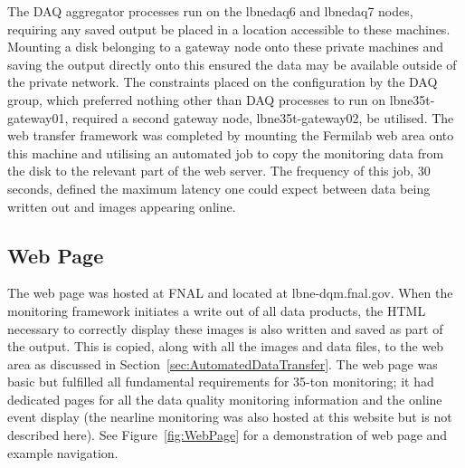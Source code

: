 The DAQ aggregator processes run on the lbnedaq6 and lbnedaq7 nodes, requiring any saved output be placed in a location accessible to these machines.  Mounting a disk belonging to a gateway node onto these private machines and saving the output directly onto this ensured the data may be available outside of the private network.  The constraints placed on the configuration by the DAQ group, which preferred nothing other than DAQ processes to run on lbne35t-gateway01, required a second gateway node, lbne35t-gateway02, be utilised.  The web transfer framework was completed by mounting the Fermilab web area onto this machine and utilising an automated job to copy the monitoring data from the disk to the relevant part of the web server.  The frequency of this job, 30 seconds, defined the maximum latency one could expect between data being written out and images appearing online.

\subsection{Web Page}\label{sec:WebPage}

The web page was hosted at FNAL and located at lbne-dqm.fnal.gov.  When the monitoring framework initiates a write out of all data products, the HTML necessary to correctly display these images is also written and saved as part of the output.  This is copied, along with all the images and data files, to the web area as discussed in Section~\ref{sec:AutomatedDataTransfer}.  The web page was basic but fulfilled all fundamental requirements for 35-ton monitoring; it had dedicated pages for all the data quality monitoring information and the online event display (the nearline monitoring was also hosted at this website but is not described here).  See Figure~\ref{fig:WebPage} for a demonstration of web page and example navigation.


